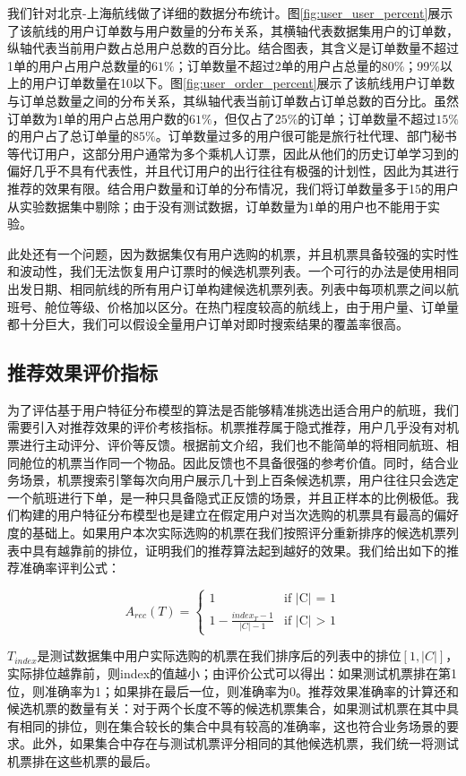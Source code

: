 我们针对北京-上海航线做了详细的数据分布统计。图\ref{fig:user_user_percent}展示了该航线的用户订单数与用户数量的分布关系，其横轴代表数据集用户的订单数，纵轴代表当前用户数占总用户总数的百分比。结合图表，其含义是订单数量不超过1单的用户占用户总数量的$61\%$；订单数量不超过2单的用户占总量的80\%；99\%以上的用户订单数量在10以下。图\ref{fig:user_order_percent}展示了该航线用户订单数与订单总数量之间的分布关系，其纵轴代表当前订单数占订单总数的百分比。虽然订单数为1单的用户占总用户数的$61\%$，但仅占了$25\%$的订单；订单数量不超过$15\%$的用户占了总订单量的$85\%$。订单数量过多的用户很可能是旅行社代理、部门秘书等代订用户，这部分用户通常为多个乘机人订票，因此从他们的历史订单学习到的偏好几乎不具有代表性，并且代订用户的出行往往有极强的计划性，因此为其进行推荐的效果有限。结合用户数量和订单的分布情况，我们将订单数量多于15的用户从实验数据集中剔除；由于没有测试数据，订单数量为1单的用户也不能用于实验。\par
此处还有一个问题，因为数据集仅有用户选购的机票，并且机票具备较强的实时性和波动性，我们无法恢复用户订票时的候选机票列表。一个可行的办法是使用相同出发日期、相同航线的所有用户订单构建候选机票列表。列表中每项机票之间以航班号、舱位等级、价格加以区分。在热门程度较高的航线上，由于用户量、订单量都十分巨大，我们可以假设全量用户订单对即时搜索结果的覆盖率很高。


\subsection{推荐效果评价指标}
为了评估基于用户特征分布模型的算法是否能够精准挑选出适合用户的航班，我们需要引入对推荐效果的评价考核指标。机票推荐属于隐式推荐，用户几乎没有对机票进行主动评分、评价等反馈。根据前文介绍，我们也不能简单的将相同航班、相同舱位的机票当作同一个物品。因此反馈也不具备很强的参考价值。同时，结合业务场景，机票搜索引擎每次向用户展示几十到上百条候选机票，用户往往只会选定一个航班进行下单，是一种只具备隐式正反馈的场景，并且正样本的比例极低。我们构建的用户特征分布模型也是建立在假定用户对当次选购的机票具有最高的偏好度的基础上。如果用户本次实际选购的机票在我们按照评分重新排序的候选机票列表中具有越靠前的排位，证明我们的推荐算法起到越好的效果。我们给出如下的推荐准确率评判公式：\par

\begin{equation}
\label{eq:a-rec}
A_{rec}(T) =
\begin{cases}
1 & \mbox{if |C| = 1}\\
1 - \frac{index_T-1}{|C|-1} & \mbox{if |C| > 1}
\end{cases}
\end{equation}\par
$T_{index}$是测试数据集中用户实际选购的机票在我们排序后的列表中的排位$[1,|C|]$，实际排位越靠前，则index的值越小；由评价公式可以得出：如果测试机票排在第1位，则准确率为1；如果排在最后一位，则准确率为0。推荐效果准确率的计算还和候选机票的数量有关：对于两个长度不等的候选机票集合，如果测试机票在其中具有相同的排位，则在集合较长的集合中具有较高的准确率，这也符合业务场景的要求。此外，如果集合中存在与测试机票评分相同的其他候选机票，我们统一将测试机票排在这些机票的最后。

